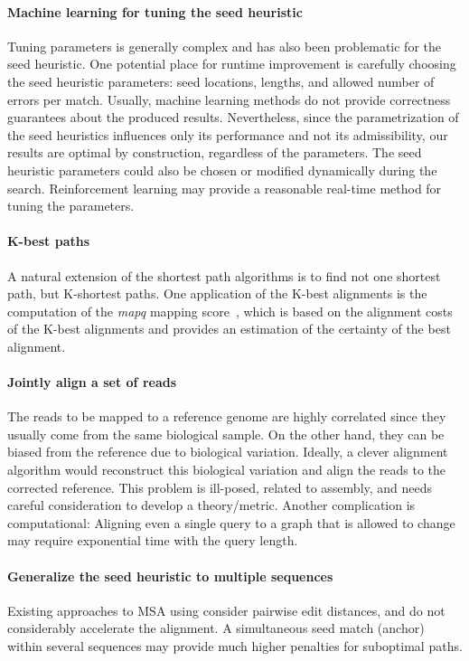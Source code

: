 \paragraph{Machine learning for tuning the seed heuristic}
Tuning parameters is generally complex and has also been problematic for the
seed heuristic. One potential place for runtime improvement is carefully
choosing the seed heuristic parameters: seed locations, lengths, and allowed
number of errors per match. Usually, machine learning methods do not provide
correctness guarantees about the produced results. Nevertheless, since the
parametrization of the seed heuristics influences only its performance and not
its admissibility, our results are optimal by construction, regardless of the
parameters. The seed heuristic parameters could also be chosen or modified
dynamically during the \A search. Reinforcement learning may provide a
reasonable real-time method for tuning the parameters.

\paragraph{K-best paths}
A natural extension of the shortest path algorithms is to find not one shortest
path, but K-shortest paths. One application of the K-best alignments is the
computation of the \textit{mapq} mapping score~\citep{li2008mapping}, which is
based on the alignment costs of the K-best alignments and provides an estimation
of the certainty of the best alignment.

\paragraph{Jointly align a set of reads}
The reads to be mapped to a reference genome are highly correlated since they
usually come from the same biological sample. On the other hand, they can be
biased from the reference due to biological variation. Ideally, a clever
alignment algorithm would reconstruct this biological variation and align the
reads to the corrected reference. This problem is ill-posed, related to
assembly, and needs careful consideration to develop a theory/metric. Another
complication is computational: Aligning even a single query to a graph that is
allowed to change may require exponential time with the query length.

\paragraph{Generalize the seed heuristic to multiple sequences}
Existing approaches to MSA using \A consider pairwise edit distances, and do not
considerably accelerate the alignment. A simultaneous seed match (anchor) within
several sequences may provide much higher penalties for suboptimal paths.

